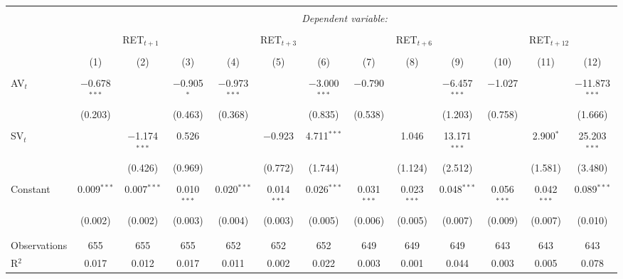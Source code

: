 
\begin{table}[!htbp] \centering 
  \caption{} 
  \label{} 
\begin{tabular}{@{\extracolsep{5pt}}lcccccccccccc} 
\\[-1.8ex]\hline 
\hline \\[-1.8ex] 
 & \multicolumn{12}{c}{\textit{Dependent variable:}} \\ 
\cline{2-13} 
\\[-1.8ex] & \multicolumn{3}{c}{RET$_{t+1}$} & \multicolumn{3}{c}{RET$_{t+3}$} & \multicolumn{3}{c}{RET$_{t+6}$} & \multicolumn{3}{c}{RET$_{t+12}$} \\ 
\\[-1.8ex] & (1) & (2) & (3) & (4) & (5) & (6) & (7) & (8) & (9) & (10) & (11) & (12)\\ 
\hline \\[-1.8ex] 
 AV$_{t}$ & $-$0.678$^{***}$ &  & $-$0.905$^{*}$ & $-$0.973$^{***}$ &  & $-$3.000$^{***}$ & $-$0.790 &  & $-$6.457$^{***}$ & $-$1.027 &  & $-$11.873$^{***}$ \\ 
  & (0.203) &  & (0.463) & (0.368) &  & (0.835) & (0.538) &  & (1.203) & (0.758) &  & (1.666) \\ 
  & & & & & & & & & & & & \\ 
 SV$_{t}$ &  & $-$1.174$^{***}$ & 0.526 &  & $-$0.923 & 4.711$^{***}$ &  & 1.046 & 13.171$^{***}$ &  & 2.900$^{*}$ & 25.203$^{***}$ \\ 
  &  & (0.426) & (0.969) &  & (0.772) & (1.744) &  & (1.124) & (2.512) &  & (1.581) & (3.480) \\ 
  & & & & & & & & & & & & \\ 
 Constant & 0.009$^{***}$ & 0.007$^{***}$ & 0.010$^{***}$ & 0.020$^{***}$ & 0.014$^{***}$ & 0.026$^{***}$ & 0.031$^{***}$ & 0.023$^{***}$ & 0.048$^{***}$ & 0.056$^{***}$ & 0.042$^{***}$ & 0.089$^{***}$ \\ 
  & (0.002) & (0.002) & (0.003) & (0.004) & (0.003) & (0.005) & (0.006) & (0.005) & (0.007) & (0.009) & (0.007) & (0.010) \\ 
  & & & & & & & & & & & & \\ 
\hline \\[-1.8ex] 
Observations & 655 & 655 & 655 & 652 & 652 & 652 & 649 & 649 & 649 & 643 & 643 & 643 \\ 
R$^{2}$ & 0.017 & 0.012 & 0.017 & 0.011 & 0.002 & 0.022 & 0.003 & 0.001 & 0.044 & 0.003 & 0.005 & 0.078 \\ 

\end{tabular}
\end{table}
